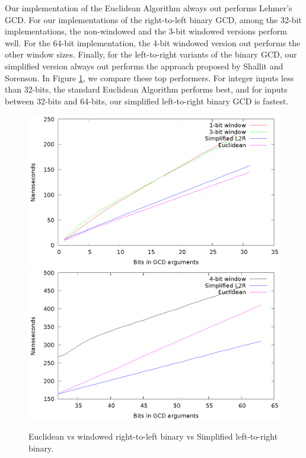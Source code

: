\documentclass{ucalgthes1}
\theoremstyle{definition}
\begin{document}
Our implementation of the Euclidean Algorithm always out performs Lehmer's GCD.  For our implementations of the right-to-left binary GCD, among the 32-bit implementations, the non-windowed and the 3-bit windowed versions perform well.  For the 64-bit implementation, the 4-bit windowed version out performs the other window sizes.  Finally, for the left-to-right variants of the binary GCD, our simplified version always out performs the approach proposed by Shallit and Sorenson.  In Figure \ref{fig:all-gcd}, we compare these top performers.  For integer inputs less than 32-bits, the standard Euclidean Algorithm performs best, and for inputs between 32-bits and 64-bits, our simplified left-to-right binary GCD is fastest.
\begin{figure}[H]
\centering
\includegraphics{all-32}
\includegraphics{all-64}
\caption{Euclidean vs windowed right-to-left binary vs Simplified left-to-right binary.}
\label{fig:all-gcd}
\end{figure}
\end{document}
